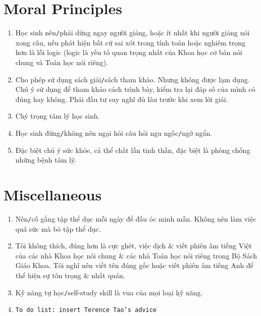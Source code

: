 \documentclass{article}
\numberwithin{equation}{section}
\begin{document}

\section{Moral Principles}

\begin{enumerate}
	\item Học sinh nên\texttt{/}phải dừng ngay người giảng, hoặc ít nhất khi người giảng nói xong câu, nếu phát hiện bất cứ sai xót trong tính toán hoặc nghiêm trọng hơn là lỗi logic (logic là yếu tố quan trọng nhất của Khoa học cơ bản nói chung và Toán học nói riêng).
	\item Cho phép sử dụng sách giải\texttt{/}sách tham khảo. Nhưng không được lạm dụng. Chú ý sử dụng để tham khảo cách trình bày, kiểm tra lại đáp số của mình có đúng hay không. Phải đầu tư suy nghĩ đủ lâu trước khi xem lời giải.
	\item Chý trọng tâm lý học sinh.
	\item Học sinh đừng\texttt{/}không nên ngại hỏi câu hỏi ngu ngốc\texttt{/}ngớ ngẩn.
	\item Đặc biệt chú ý sức khỏe, cả thể chất lẫn tinh thần, đặc biệt là phòng chống những bệnh tâm lý.
\end{enumerate}

\section{Miscellaneous}

\begin{enumerate}
	\item Nên\texttt{/}cố gắng tập thể dục mỗi ngày để đầu óc minh mẫn. Không nên làm việc quá sức mà bỏ tập thể dục.
	\item Tôi không thích, đúng hơn là cực ghét, việc dịch \& viết phiên âm tiếng Việt của các nhà Khoa học nói chung \& các nhà Toán học nói riêng trong Bộ Sách Giáo Khoa. Tôi nghĩ nên viết tên đúng gốc hoặc viết phiên âm tiếng Anh để thể hiện sự tôn trọng \& nhất quán.
	\item Kỹ năng tự học\texttt{/}self-study skill là vua của mọi loại kỹ năng.
	\item \texttt{To do list: insert Terence Tao's advice}
\end{enumerate}


\printbibliography[heading=bibintoc]
	
\end{document}
